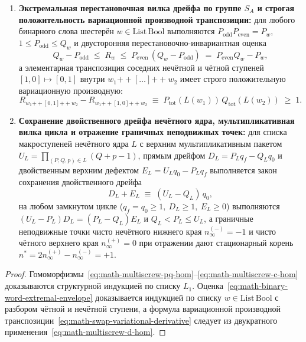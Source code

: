 \begin{theorem}
\begin{enumerate}[label=\textbf{(\arabic*)},leftmargin=*]
\item \textbf{Экстремальная перестановочная вилка дрейфа по группе $S_A$ и строгая положительность вариационной производной транспозиции:}
  для любого бинарного слова шестерён $w \in \mathrm{List}\,\mathrm{Bool}$ выполняются $P_{\mathrm{odd}} P_{\mathrm{even}} = P_w$, $1 \le P_{\mathrm{odd}} \le Q_w$ и двусторонняя перестановочно-инвариантная оценка
  \begin{equation}
    \label{eq:math-binary-word-extremal-envelope}
    Q_w - P_{\mathrm{odd}} \;\le\; R_w \;\le\; P_{\mathrm{even}}\,(Q_w - P_{\mathrm{odd}}) \;=\; P_{\mathrm{even}} Q_w - P_w,
  \end{equation}
  а элементарная транспозиция соседних нечётной и чётной ступеней $[1, 0] \mapsto [0, 1]$ внутри $w_1 \mathbin{+\!+} [\dots] \mathbin{+\!+} w_2$ имеет строго положительную вариационную производную:
  \begin{equation}
    \label{eq:math-swap-variational-derivative}
    R_{w_1 \mathbin{+\!+} [0, 1] \mathbin{+\!+} w_2} - R_{w_1 \mathbin{+\!+} [1, 0] \mathbin{+\!+} w_2}
    \;\equiv\;
    P_{\mathrm{tot}}(L(w_1))\,Q_{\mathrm{tot}}(L(w_2)) \;\ge\; 1.
  \end{equation}
\item \textbf{Сохранение двойственного дрейфа нечётного ядра, мультипликативная вилка цикла и отражение граничных неподвижных точек:}
  для списка макроступеней нечётного ядра $L$ с верхним мультипликативным пакетом $U_L = \prod_{(P,Q,p)\in L} (Q + p - 1)$, прямым дрейфом $D_L = P_L q_f - Q_L q_0$ и двойственным верхним дефектом $E_L = U_L q_0 - P_L q_f$ выполняется закон сохранения двойственного дрейфа
  \begin{equation}
    \label{eq:math-dual-core-drift-conservation}
    D_L + E_L \;\equiv\; (U_L - Q_L)\,q_0,
  \end{equation}
  на любом замкнутом цикле ($q_f = q_0 \ge 1,\ D_L \ge 1,\ E_L \ge 0$) выполняются $(U_L - P_L)D_L = (P_L - Q_L)E_L$ и $Q_L < P_L \le U_L$, а граничные неподвижные точки чисто нечётного нижнего края $n_\infty^{(-)} = -1$ и чисто чётного верхнего края $n_\infty^{(+)} = 0$ при отражении дают стационарный корень $n^* = 2 n_\infty^{(+)} - n_\infty^{(-)} = +1$.
\end{enumerate}
\end{theorem}

\begin{proof}
\leanok
Гомоморфизмы~\eqref{eq:math-multiscrew-pq-hom}--\eqref{eq:math-multiscrew-c-hom} доказываются структурной индукцией по списку $L_1$. Оценка~\eqref{eq:math-binary-word-extremal-envelope} доказывается индукцией по списку $w \in \mathrm{List}\,\mathrm{Bool}$ с разбором чётной и нечётной ступени, а формула вариационной производной транспозиции~\eqref{eq:math-swap-variational-derivative} следует из двукратного применения~\eqref{eq:math-multiscrew-d-hom}.
\end{proof}

